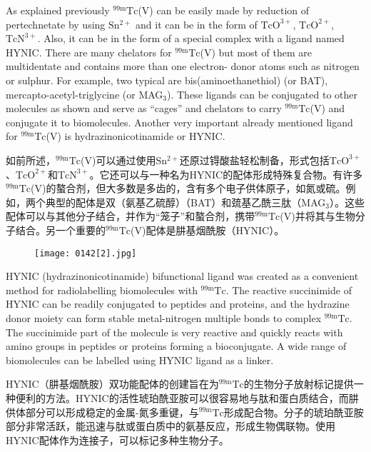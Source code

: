 \documentclass[dvipsnames, svgnames,a4paper,11pt]{article}
\begin{document}
As explained previously ${}^\mathrm{99m}\mathrm{Tc}$(V) can be easily made by reduction of pertechnetate
by using $\mathrm{Sn^{2+}}$ and it can be in the form of $\mathrm{TcO^{3+}}$, $\mathrm{TcO^{2+}}$, $\mathrm{TcN^{3+}}$. Also, it can be in the
form of a special complex with a ligand named HYNIC. There are many chelators for
${}^\mathrm{99m}\mathrm{Tc}$(V) but most of them are multidentate and contains more than one electron-
donor atoms such as nitrogen or sulphur. For example, two typical are
bis(aminoethanethiol) (or BAT), mercapto-acetyl-triglycine (or MAG${}_3$). These ligands
can be conjugated to other molecules as shown and serve as “cages” and chelators
to carry ${}^\mathrm{99m}\mathrm{Tc}$(V) and conjugate it to biomolecules. Another very important already
mentioned ligand for ${}^\mathrm{99m}\mathrm{Tc}$(V) is hydrazinonicotinamide or HYNIC.

如前所述，${}^\mathrm{99m}\mathrm{Tc}$(V)可以通过使用$\mathrm{Sn^{2+}}$还原过锝酸盐轻松制备，形式包括$\mathrm{TcO^{3+}}$、$\mathrm{TcO^{2+}}$和$\mathrm{TcN^{3+}}$。它还可以与一种名为HYNIC的配体形成特殊复合物。有许多${}^\mathrm{99m}\mathrm{Tc}$(V)的螯合剂，但大多数是多齿的，含有多个电子供体原子，如氮或硫。例如，两个典型的配体是双（氨基乙硫醇）（BAT）和巯基乙酰三肽（MAG${}_3$）。这些配体可以与其他分子结合，并作为“笼子”和螯合剂，携带${}^\mathrm{99m}\mathrm{Tc}$(V)并将其与生物分子结合。另一个重要的${}^\mathrm{99m}\mathrm{Tc}$(V)配体是肼基烟酰胺（HYNIC）。

\begin{figure}[h]
	\centering
    \texttt{[image: 0142[2].jpg]}    
     \label{fig150}
\end{figure}

HYNIC (hydrazinonicotinamide) bifunctional ligand was created as a convenient
method for radiolabelling biomolecules with ${}^\mathrm{99m}\mathrm{Tc}$. The reactive succinimide of HYNIC can be readily conjugated to peptides and proteins, and the hydrazine donor
moiety can form stable metal-nitrogen multiple bonds to complex ${}^\mathrm{99m}\mathrm{Tc}$. The
succinimide part of the molecule is very reactive and quickly reacts with amino
groups in peptides or proteins forming a bioconjugate. A wide range of biomolecules
can be labelled using HYNIC ligand as a linker.

HYNIC（肼基烟酰胺）双功能配体的创建旨在为${}^\mathrm{99m}\mathrm{Tc}$的生物分子放射标记提供一种便利的方法。HYNIC的活性琥珀酰亚胺可以很容易地与肽和蛋白质结合，而肼供体部分可以形成稳定的金属-氮多重键，与${}^\mathrm{99m}\mathrm{Tc}$形成配合物。分子的琥珀酰亚胺部分非常活跃，能迅速与肽或蛋白质中的氨基反应，形成生物偶联物。使用HYNIC配体作为连接子，可以标记多种生物分子。
\end{document}
